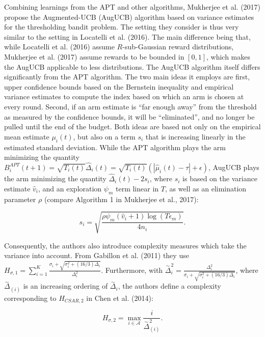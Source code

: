 \documentclass[11pt,]{article}
\begin{document}
Combining learnings from the APT and other algorithms, Mukherjee et al.
(2017) propose the Augmented-UCB (AugUCB) algorithm based on variance
estimates for the thresholding bandit problem. The setting they consider
is thus very similar to the setting in Locatelli et al. (2016). The main
difference being that, while Locatelli et al. (2016) assume
\(R\)-sub-Gaussian reward distributions, Mukherjee et al. (2017) assume
rewards to be bounded in \([0,1]\), which makes the AugUCB applicable to
less distributions. The AugUCB algorithm itself differs significantly
from the APT algorithm. The two main ideas it employs are first, upper
confidence bounds based on the Bernstein inequality and empirical
variance estimates to compute the index based on which an arm is chosen
at every round. Second, if an arm estimate is ``far enough away'' from
the threshold as measured by the confidence bounds, it will be
``eliminated'', and no longer be pulled until the end of the budget.
Both ideas are based not only on the empirical mean estimate
\(\mu_i(t)\), but also on a term \(s_i\) that is increasing linearly in
the estimated standard deviation. While the APT algorithm plays the arm
minimizing the quantity
\(B_i^{APT}(t+1) = \sqrt{T_i(t)} \hat{\Delta}_i(t) = \sqrt{T_i(t)} (|\hat{\mu}_i(t) - \tau| + \epsilon)\),
AugUCB plays the arm minimizing the quantity
\(\hat{\Delta}_i(t) - 2s_i\), where \(s_i\) is based on the variance
estimate \(\hat{v}_i\), and an exploration \(\psi_m\) term linear in
\(T\), as well as an elimination parameter \(\rho\) (compare Algorithm 1
in Mukherjee et al., 2017):

\begin{equation*}
s_i = \sqrt{\frac{\rho \psi_m (\hat{v}_i + 1) \log(T \epsilon_m)}{4n_i}}.
\end{equation*}

Consequently, the authors also introduce complexity measures which take
the variance into account. From Gabillon et al. (2011) they use
\(H_{\sigma, 1}= \sum_{i=1}^K \frac{\sigma_i + \sqrt{\sigma_i^2 + (16/3)\Delta_i}}{\Delta_i^2}\).
Furthermore, with
\(\stackrel{\sim}{\Delta}_i^2 = \frac{\Delta_i^2}{\sigma_i + \sqrt{\sigma_i^2 + (16/3)\Delta_i}}\),
where \(\stackrel{\sim}{\Delta}_{(i)}\) is an increasing ordering of
\(\stackrel{\sim}{\Delta}_i\), the authors define a complexity
corresponding to \(H_{CSAR,2}\) in Chen et al. (2014):

\begin{equation*}
H_{\sigma,2} = \max_{i \in \mathcal{A}} \frac{i}{\stackrel{\sim}{\Delta}_{(i)}^2}.
\end{equation*}
\end{document}
